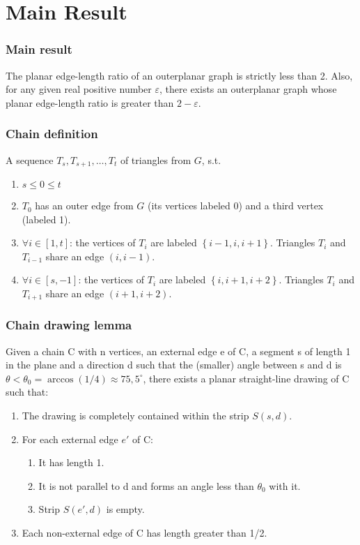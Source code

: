 \documentclass[xetex,mathserif,serif]{beamer}
\begin{document}
\section{Main Result}

\begin{frame}
  \frametitle{Main result}
  \begin{theorem}
    The planar edge-length ratio of an outerplanar graph is strictly less than 2. Also, for any given real positive number \(\varepsilon\), there exists an outerplanar graph whose planar edge-length ratio is greater than \(2 - \varepsilon\).
    \end{theorem}
\end{frame}

\begin{frame}
  \frametitle{Chain definition}
  A sequence \(T_s, T_{s+1}, \dots, T_t\) of triangles from \(G\), s.t.
  \begin{enumerate}
  \item \(s \leq 0 \leq t\)
  \item \(T_0\) has an outer edge from \(G\) (its vertices labeled 0) and a third vertex (labeled 1).
  \item \(\forall i\in [1, t]\): the vertices of \(T_i\) are labeled \(\left\{i - 1, i, i + 1\right\}\). Triangles \(T_i\) and \(T_{i - 1}\) share an edge \((i, i - 1)\).
  \item \(\forall i\in [s, -1]\): the vertices of \(T_i\) are labeled \(\left\{i, i + 1, i + 2\right\}\). Triangles \(T_i\) and \(T_{i + 1}\) share an edge \((i + 1, i + 2)\).
    \end{enumerate}
  \end{frame}

\begin{frame}
  \frametitle{Chain drawing lemma}
  \begin{lemma}
    Given a chain C with n vertices, an external edge e of C, a segment s of length 1 in the plane and a direction d such that the (smaller) angle between s and d is \(\theta < \theta_0 = \arccos(1/4)\approx 75,5^{\circ}\), there exists a planar straight-line drawing of C such that:
    \begin{enumerate}
    \item The drawing is completely contained within the strip \(S(s, d)\).
    \item For each external edge \(e'\) of C:
      \begin{enumerate}
      \item It has length 1.
      \item It is not parallel to d and forms an angle less than \(\theta_0\) with it.
      \item Strip \(S(e', d)\) is empty.
      \end{enumerate}
    \item Each non-external edge of C has length greater than 1/2.
    \end{enumerate}
  \end{lemma}
\end{frame}
\end{document}
